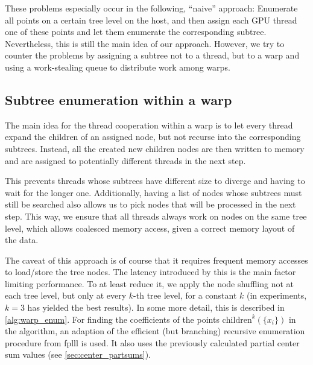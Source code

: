 \documentclass{scrartcl}
\begin{document}
    These problems especially occur in the following, ``naive'' approach: Enumerate all points on a certain tree level on the host, and then assign each GPU thread one of these points and let them enumerate the corresponding subtree.
    Nevertheless, this is still the main idea of our approach. However, we try to counter the problems by assigning a subtree not to a thread, but to a warp and using a work-stealing queue to distribute work among warps.

    \subsection{Subtree enumeration within a warp}

    The main idea for the thread cooperation within a warp is to let every thread expand the children of an assigned node, but not recurse into the corresponding subtrees. Instead, all the created new children nodes are then written to memory and are assigned to potentially different threads in the next step.

    This prevents threads whose subtrees have different size to diverge and having to wait for the longer one. Additionally, having a list of nodes whose subtrees must still be searched also allows us to pick nodes that will be processed in the next step. This way, we ensure that all threads always work on nodes on the same tree level, which allows coalesced memory access, given a correct memory layout of the data.

    The caveat of this approach is of course that it requires frequent memory accesses to load/store the tree nodes. The latency introduced by this is the main factor limiting performance. To at least reduce it, we apply the node shuffling not at each tree level, but only at every $k$-th tree level, for a constant $k$ (in experiments, $k = 3$ has yielded the best results).
    In some more detail, this is described in \ref{alg:warp_enum}. For finding the coefficients of the points $\mathrm{children}^k(\{x_i\})$ in the algorithm, an adaption of the efficient (but branching) recursive enumeration procedure from fplll is used. It also uses the previously calculated partial center sum values (see \ref{sec:center_partsums}).
\end{document}
